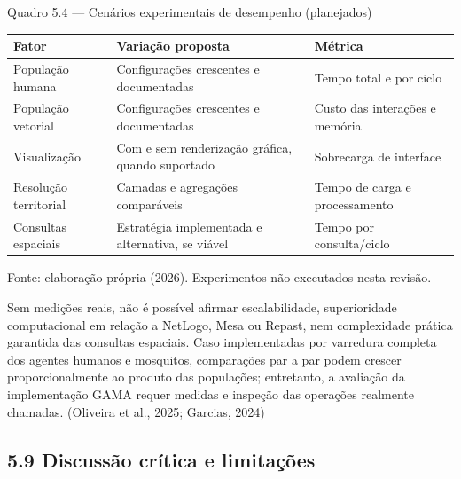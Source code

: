 Quadro 5.4 --- Cenários experimentais de desempenho (planejados)

\begin{longtable}[]{@{}
  >{\raggedright\arraybackslash}p{}
  >{\raggedright\arraybackslash}p{}
  >{\raggedright\arraybackslash}p{}@{}}
\toprule\noalign{}
\begin{minipage}[b]{\linewidth}\raggedright
\textbf{Fator}
\end{minipage} & \begin{minipage}[b]{\linewidth}\raggedright
\textbf{Variação proposta}
\end{minipage} & \begin{minipage}[b]{\linewidth}\raggedright
\textbf{Métrica}
\end{minipage} \\
\midrule\noalign{}
\endhead
\bottomrule\noalign{}
\endlastfoot
População humana & Configurações crescentes e documentadas & Tempo total
e por ciclo \\
População vetorial & Configurações crescentes e documentadas & Custo das
interações e memória \\
Visualização & Com e sem renderização gráfica, quando suportado &
Sobrecarga de interface \\
Resolução territorial & Camadas e agregações comparáveis & Tempo de
carga e processamento \\
Consultas espaciais & Estratégia implementada e alternativa, se viável &
Tempo por consulta/ciclo \\
\end{longtable}

Fonte: elaboração própria (2026). Experimentos não executados nesta
revisão.

Sem medições reais, não é possível afirmar escalabilidade, superioridade
computacional em relação a NetLogo, Mesa ou Repast, nem complexidade
prática garantida das consultas espaciais. Caso implementadas por
varredura completa dos agentes humanos e mosquitos, comparações par a
par podem crescer proporcionalmente ao produto das populações;
entretanto, a avaliação da implementação GAMA requer medidas e inspeção
das operações realmente chamadas. (Oliveira et al., 2025; Garcias, 2024)

\subsection{5.9 Discussão crítica e
limitações}\label{discussuxe3o-cruxedtica-e-limitauxe7uxf5es}

